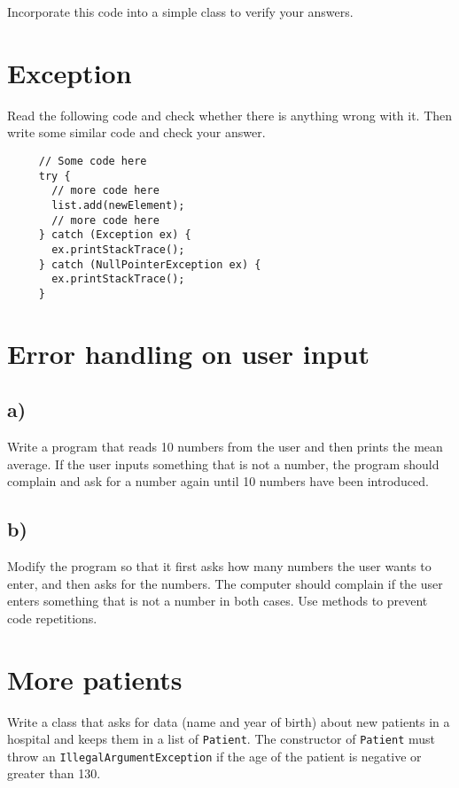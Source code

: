 \documentclass{article}
\begin{document}
Incorporate this code into a simple class to verify your answers. 

\section{Exception}
\label{sec:exception}

Read the following code and check whether there is anything wrong with
it. Then write some similar code and check your answer. 

\begin{verbatim}
     // Some code here
     try {
       // more code here
       list.add(newElement);
       // more code here
     } catch (Exception ex) {
       ex.printStackTrace();
     } catch (NullPointerException ex) {
       ex.printStackTrace();    
     }
\end{verbatim}


\section{Error handling on user input}
\label{sec:error-handling-user}

\subsection*{a)}

Write a program that reads 10 numbers from the user and then prints
the mean average. If the user inputs something that is not a number,
the program should complain and ask for a number again until 10
numbers have been introduced. 

\subsection*{b)}

Modify the program so that it first asks how many numbers the user
wants to enter, and then asks for the numbers. The computer should
complain if the user enters something that is not a number in both
cases. Use methods to prevent code repetitions. 


\section{More patients}
\label{sec:more-patients}

Write a class that asks for data (name and year of birth) about new patients in a
hospital and keeps them in a list of \verb+Patient+. The constructor
of \verb+Patient+ must throw an \verb+IllegalArgumentException+ if the
age of the patient is negative or greater than 130. 
\end{document}
